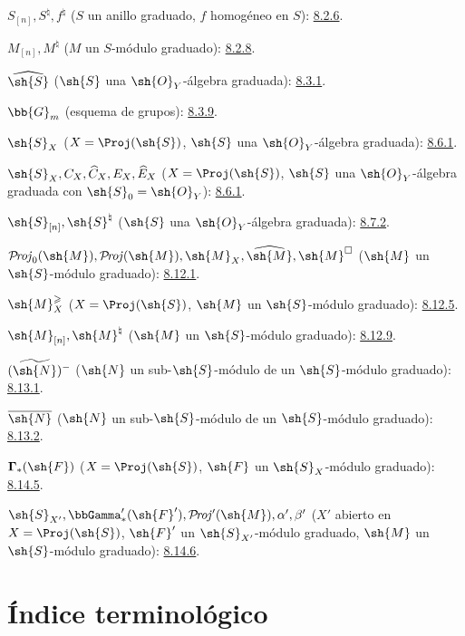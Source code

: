 \documentclass[oneside,10pt]{amsart}
\renewcommand{\geq}{\geqslant}
\def\shProj{\mathcal{P}\!\mathit{roj}}
\newcommand{\oldpage}[2][]{\marginnote{\normalfont\footnotesize\textbf{#1}~|~#2}\ignorespaces}
\begin{document}
$S_{[n]},S^\natural,f^\natural$
($S$ un anillo graduado, $f$ homogéneo en $S$): \hyperref[II.8.2.6]{8.2.6}.

$M_{[n]},M^\natural$ ($M$ un $S$-módulo graduado): \hyperref[II.8.2.8]{8.2.8}.

$\widehat{\sh{S}}$ ($\sh{S}$ una $\sh{O}_Y$-álgebra graduada): \hyperref[II.8.3.1]{8.3.1}.

$\bb{G}_m$ (esquema de grupos): \hyperref[II.8.3.9]{8.3.9}.

$\sh{S}_X$ ($X=\Proj(\sh{S})$, $\sh{S}$ una $\sh{O}_Y$-álgebra graduada): \hyperref[II.8.6.1]{8.6.1}.

$\sh{S}_X,C_X,\widehat C_X,E_X,\widehat E_X$
($X=\Proj(\sh{S})$, $\sh{S}$ una $\sh{O}_Y$-álgebra graduada
con $\sh{S}_0=\sh{O}_Y$): \hyperref[II.8.6.1]{8.6.1}.

$\sh{S}_{[n]},\sh{S}^{\natural}$
($\sh{S}$ una $\sh{O}_Y$-álgebra graduada): \hyperref[II.8.7.2]{8.7.2}.

$\shProj_0(\sh{M}),\shProj(\sh{M}),\sh{M}_X,
\widehat{\sh{M}},\sh{M}^{\square}$
($\sh{M}$ un $\sh{S}$-módulo graduado): \hyperref[II.8.12.1]{8.12.1}.

$\sh{M}_X^\geq$
($X=\Proj(\sh{S})$, $\sh{M}$ un $\sh{S}$-módulo graduado): \hyperref[II.8.12.5]{8.12.5}.

$\sh{M}_{[n]},\sh{M}^{\natural}$
($\sh{M}$ un $\sh{S}$-módulo graduado): \hyperref[II.8.12.9]{8.12.9}.

$(\widetilde{\sh{N}})^-$
($\sh{N}$ un sub-$\sh{S}$-módulo de un $\sh{S}$-módulo graduado): \hyperref[II.8.13.1]{8.13.1}.

$\overline{\sh{N}}$
($\sh{N}$ un sub-$\sh{S}$-módulo de un $\sh{S}$-módulo graduado): \hyperref[II.8.13.2]{8.13.2}.

$\boldsymbol{\Gamma}_*(\sh{F})$
($X=\Proj(\sh{S})$, $\sh{F}$ un $\sh{S}_X$-módulo graduado): \hyperref[II.8.14.5]{8.14.5}.

$\sh{S}_{X'},\bbGamma'_*(\sh{F}'),\shProj'(\sh{M}),
\alpha',\beta'$
($X'$ abierto en $X=\Proj(\sh{S})$, $\sh{F}'$ un $\sh{S}_{X'}$-módulo graduado,
$\sh{M}$ un $\sh{S}$-módulo graduado): \hyperref[II.8.14.6]{8.14.6}.

\endgroup

\clearpage
\oldpage[II]{209}
{}
\section*{Índice terminológico}

\begingroup
\small
\setlength{\parindent}{0pt}
\setlength{\parskip}{2pt}
\newcommand{\egaTerm}[2]{#1: #2.\par}
\end{document}
